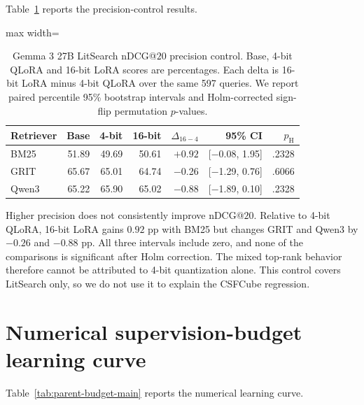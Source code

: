 \documentclass[pdflatex,sn-basic,Numbered]{sn-jnl}%
\theoremstyle{thmstyleone}%
\theoremstyle{thmstyletwo}%
\theoremstyle{thmstylethree}%
\begin{document}
Table~\ref{tab:gemma27b-precision} reports the precision-control results.

\begin{table}[t]


\centering
\scriptsize
\setlength{\tabcolsep}{7pt}
\renewcommand{\arraystretch}{1.08}
\begin{adjustbox}{max width=\linewidth}
\begin{tabular}{lrrrrrr}
\hline
Retriever & Base & 4-bit & 16-bit & $\Delta_{16-4}$ & 95\% CI & $p_{\mathrm{H}}$ \\
\hline
BM25  & 51.89 & 49.69 & 50.61 & $+0.92$ & [$-$0.08, 1.95] & .2328 \\
GRIT  & 65.67 & 65.01 & 64.74 & $-$0.26 & [$-$1.29, 0.76] & .6066 \\
Qwen3 & 65.22 & 65.90 & 65.02 & $-$0.88 & [$-$1.89, 0.10] & .2328 \\
\hline
\end{tabular}
\end{adjustbox}


\caption{Gemma 3 27B LitSearch nDCG@$20$ precision control. Base, 4-bit
QLoRA and 16-bit LoRA scores are percentages. Each delta is 16-bit LoRA minus
4-bit QLoRA over the same 597 queries. We report paired percentile 95\%
bootstrap intervals and Holm-corrected sign-flip permutation $p$-values.}
\label{tab:gemma27b-precision}
\end{table}

Higher precision does not consistently improve nDCG@$20$. Relative to 4-bit
QLoRA, 16-bit LoRA gains $0.92$ pp with BM25 but changes GRIT and Qwen3 by
$-0.26$ and $-0.88$ pp. All three intervals include zero, and none of the
comparisons is significant after Holm correction. The mixed top-rank behavior
therefore cannot be attributed to 4-bit quantization alone. This control covers
LitSearch only, so we do not use it to explain the CSFCube regression.

\FloatBarrier
\section{Numerical supervision-budget learning curve}
\label{supp:budget}

Table~\ref{tab:parent-budget-main} reports the numerical learning curve.
\end{document}

